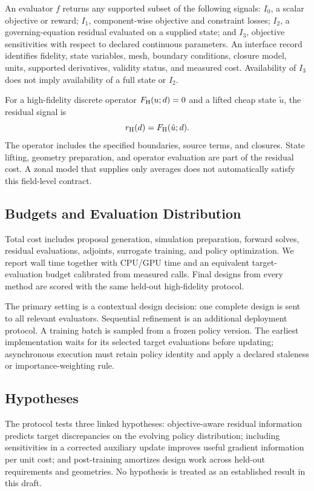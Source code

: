 An evaluator $f$ returns any supported subset of the following signals: $I_0$, a scalar objective or reward; $I_1$, component-wise objective and constraint losses; $I_2$, a governing-equation residual evaluated on a supplied state; and $I_3$, objective sensitivities with respect to declared continuous parameters. An interface record identifies fidelity, state variables, mesh, boundary conditions, closure model, units, supported derivatives, validity status, and measured cost. Availability of $I_3$ does not imply availability of a full state or $I_2$.

For a high-fidelity discrete operator $F_{\mathrm{H}}(u;d)=0$ and a lifted cheap state $\tilde u$, the residual signal is
\begin{equation}
r_{\mathrm{H}}(d)=F_{\mathrm{H}}(\tilde u;d).
\label{eq:residual}
\end{equation}
The operator includes the specified boundaries, source terms, and closures. State lifting, geometry preparation, and operator evaluation are part of the residual cost. A zonal model that supplies only averages does not automatically satisfy this field-level contract.

\subsection{Budgets and Evaluation Distribution}
Total cost includes proposal generation, simulation preparation, forward solves, residual evaluations, adjoints, surrogate training, and policy optimization. We report wall time together with CPU/GPU time and an equivalent target-evaluation budget calibrated from measured calls. Final designs from every method are scored with the same held-out high-fidelity protocol.

The primary setting is a contextual design decision: one complete design is sent to all relevant evaluators. Sequential refinement is an additional deployment protocol. A training batch is sampled from a frozen policy version. The earliest implementation waits for its selected target evaluations before updating; asynchronous execution must retain policy identity and apply a declared staleness or importance-weighting rule.

\subsection{Hypotheses}
The protocol tests three linked hypotheses: objective-aware residual information predicts target discrepancies on the evolving policy distribution; including sensitivities in a corrected auxiliary update improves useful gradient information per unit cost; and post-training amortizes design work across held-out requirements and geometries. No hypothesis is treated as an established result in this draft.
